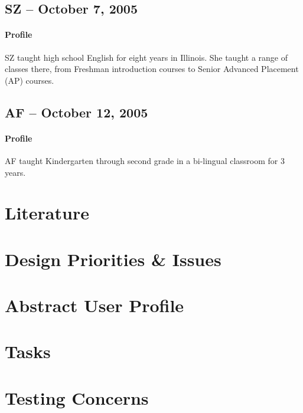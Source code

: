 \documentclass[12pt,titlepage]{article}
\begin{document}
\subsection{SZ -- October 7, 2005}
\paragraph{Profile} SZ taught high school English for eight years in Illinois.
She taught a range of classes there, from Freshman introduction courses to
Senior Advanced Placement (AP) courses.

\subsection{AF -- October 12, 2005}
\paragraph{Profile} AF taught Kindergarten through second grade in a bi-lingual
classroom for 3 years.

\section{Literature}

\section{Design Priorities \& Issues}

\section{Abstract User Profile}

\section{Tasks}

\section{Testing Concerns}
\end{document}
